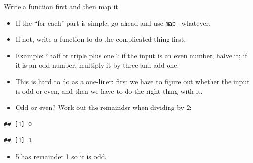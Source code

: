 \documentclass[
  ignorenonframetext,
]{beamer}
\newenvironment{Shaded}{\begin{snugshade}}{\end{snugshade}}
\newcommand{\DecValTok}[1]{\textcolor[rgb]{0.00,0.00,0.81}{#1}}
\newcommand{\OperatorTok}[1]{\textcolor[rgb]{0.81,0.36,0.00}{\textbf{#1}}}
\newcommand{\StringTok}[1]{\textcolor[rgb]{0.31,0.60,0.02}{#1}}
\providecommand{\tightlist}{%
  \setlength{\itemsep}{0pt}\setlength{\parskip}{0pt}}
\begin{document}
\begin{frame}[fragile]{Write a function first and then map it}
\protect\hypertarget{write-a-function-first-and-then-map-it}{}

\begin{itemize}
\tightlist
\item
  If the ``for each'' part is simple, go ahead and use
  \texttt{map\_}-whatever.
\item
  If not, write a function to do the complicated thing first.
\item
  Example: ``half or triple plus one'': if the input is an even number,
  halve it; if it is an odd number, multiply it by three and add one.
\item
  This is hard to do as a one-liner: first we have to figure out whether
  the input is odd or even, and then we have to do the right thing with
  it.
\item
  Odd or even? Work out the remainder when dividing by 2:
\end{itemize}

\begin{Shaded}
\end{Shaded}

\begin{verbatim}
## [1] 0
\end{verbatim}

\begin{Shaded}
\end{Shaded}

\begin{verbatim}
## [1] 1
\end{verbatim}

\begin{itemize}
\tightlist
\item
  5 has remainder 1 so it is odd.
\end{itemize}

\end{frame}
\end{document}
